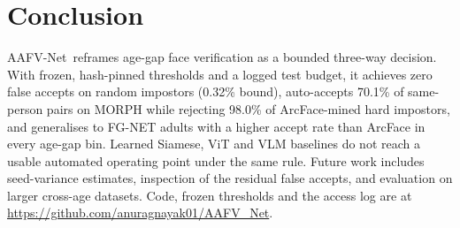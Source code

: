 \documentclass[10pt,twocolumn]{article}
\newcommand{\sys}{AAFV-Net}
\begin{document}
\section{Conclusion}
\sys\ reframes age-gap face verification as a bounded three-way decision. With frozen, hash-pinned thresholds and a logged test budget, it achieves zero false accepts on random impostors (0.32\% bound), auto-accepts 70.1\% of same-person pairs on MORPH while rejecting 98.0\% of ArcFace-mined hard impostors, and generalises to FG-NET adults with a higher accept rate than ArcFace in every age-gap bin. Learned Siamese, ViT and VLM baselines do not reach a usable automated operating point under the same rule. Future work includes seed-variance estimates, inspection of the residual false accepts, and evaluation on larger cross-age datasets. Code, frozen thresholds and the access log are at \url{https://github.com/anuragnayak01/AAFV_Net}.
\end{document}
